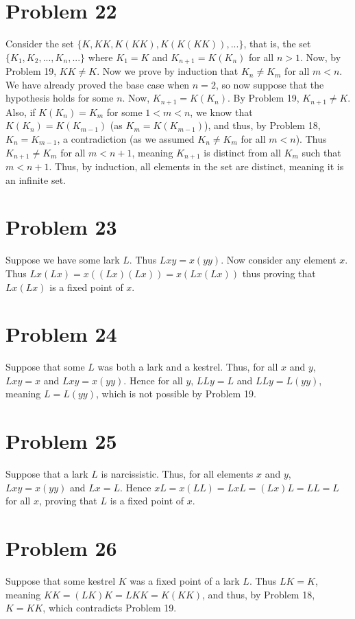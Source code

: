 \documentclass{article}
\theoremstyle{definition}
\begin{document}
\section*{Problem 22}
Consider the set $\{K,KK,K(KK),K(K(KK)),...\}$, that is, the set $\{K_1,K_2,...,K_n,...\}$ where $K_1=K$ and $K_{n+1}=K(K_n)$ for all $n>1$. Now, by Problem 19, 
$KK\ne K$. Now we prove by induction that $K_n\ne K_m$ for all $m<n$. We have already proved the base case when $n=2$, so now suppose that the hypothesis holds for some $n$. 
Now, $K_{n+1}=K(K_n)$. By Problem 19, $K_{n+1}\ne K$. Also, if $K(K_n)=K_m$ for some $1<m<n$, we know that $K(K_n)=K(K_{m-1})$ (as $K_m=K(K_{m-1})$), and thus, by Problem 18, 
$K_n=K_{m-1}$, a contradiction (as we assumed $K_n\ne K_m$ for all $m<n$). Thus $K_{n+1}\ne K_m$ for all $m<n+1$, meaning $K_{n+1}$ is distinct from all 
$K_m$ such that $m<n+1$. Thus, by induction, all elements in the set are distinct, meaning it is an infinite set. 

\section*{Problem 23}
Suppose we have some lark $L$. Thus $Lxy=x(yy)$. Now consider any element $x$. Thus $Lx(Lx)=x((Lx)(Lx))=x(Lx(Lx))$ thus proving that $Lx(Lx)$ is a fixed point of $x$.

\section*{Problem 24}
Suppose that some $L$ was both a lark and a kestrel. Thus, for all $x$ and $y$, $Lxy=x$ and $Lxy=x(yy)$. Hence for all $y$, $LLy=L$ and $LLy=L(yy)$, meaning 
$L=L(yy)$, which is not possible by Problem 19.

\section*{Problem 25}
Suppose that a lark $L$ is narcissistic. Thus, for all elements $x$ and $y$, $Lxy=x(yy)$ and $Lx=L$. Hence $xL=x(LL)=LxL=(Lx)L=LL=L$ for all $x$, 
proving that $L$ is a fixed point of $x$.

\section*{Problem 26}
Suppose that some kestrel $K$ was a fixed point of a lark $L$. Thus $LK=K$, meaning $KK=(LK)K=LKK=K(KK)$, and thus, by Problem 18, $K=KK$, which contradicts Problem 19. 
\end{document}
